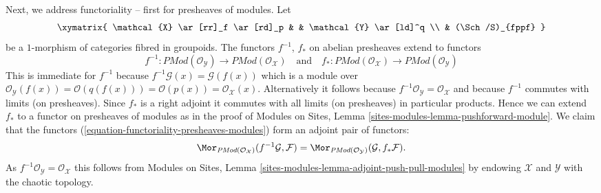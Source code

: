 \medskip\noindent
Next, we address functoriality -- first for presheaves of modules. Let
$$
\xymatrix{
\mathcal{X} \ar[rr]_f \ar[rd]_p & &  \mathcal{Y} \ar[ld]^q \\
& (\Sch/S)_{fppf}
}
$$
be a $1$-morphism of categories fibred in groupoids.
The functors $f^{-1}$, $f_*$ on abelian presheaves extend to functors
\begin{equation}
\label{equation-functoriality-presheaves-modules}
f^{-1} :
\textit{PMod}(\mathcal{O}_\mathcal{Y})
\longrightarrow
\textit{PMod}(\mathcal{O}_\mathcal{X})
\quad\text{and}\quad
f_* :
\textit{PMod}(\mathcal{O}_\mathcal{X})
\longrightarrow
\textit{PMod}(\mathcal{O}_\mathcal{Y})
\end{equation}
This is immediate for $f^{-1}$ because
$f^{-1}\mathcal{G}(x) = \mathcal{G}(f(x))$ which is a module over
$\mathcal{O}_\mathcal{Y}(f(x)) = \mathcal{O}(q(f(x))) = \mathcal{O}(p(x)) =
\mathcal{O}_\mathcal{X}(x)$. Alternatively it follows because
$f^{-1}\mathcal{O}_\mathcal{Y} = \mathcal{O}_\mathcal{X}$
and because $f^{-1}$ commutes with limits (on presheaves).
Since $f_*$ is a right adjoint it commutes with all limits
(on presheaves) in particular products. Hence we can extend
$f_*$ to a functor on presheaves of modules as in the proof of
Modules on Sites, Lemma \ref{sites-modules-lemma-pushforward-module}.
We claim that the functors (\ref{equation-functoriality-presheaves-modules})
form an adjoint pair of functors:
$$
\Mor_{\textit{PMod}(\mathcal{O}_\mathcal{X})}(
f^{-1}\mathcal{G}, \mathcal{F})
=
\Mor_{\textit{PMod}(\mathcal{O}_\mathcal{Y})}(
\mathcal{G}, f_*\mathcal{F}).
$$
As $f^{-1}\mathcal{O}_\mathcal{Y} = \mathcal{O}_\mathcal{X}$
this follows from
Modules on Sites, Lemma \ref{sites-modules-lemma-adjoint-push-pull-modules}
by endowing $\mathcal{X}$ and $\mathcal{Y}$ with the chaotic
topology.

